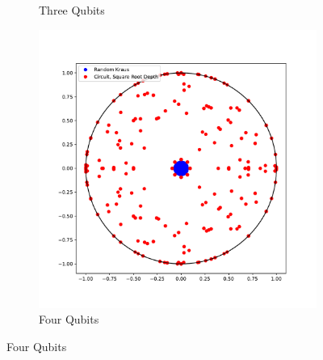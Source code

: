 \documentclass{article}
\begin{document}
\begin{figure}[htbp]
\begin{subfigure}[t]{0.3\textwidth}
\caption{Three Qubits}
\label{fig:figure14_2}
\end{subfigure}\hfill
\begin{subfigure}[t]{0.3\textwidth}
    \includegraphics[width=\linewidth]{../figures/fourQubit_squareRootDepth}
\caption{Four Qubits}
\label{fig:figure14_3}
\end{subfigure}


\end{figure}
\end{document}
